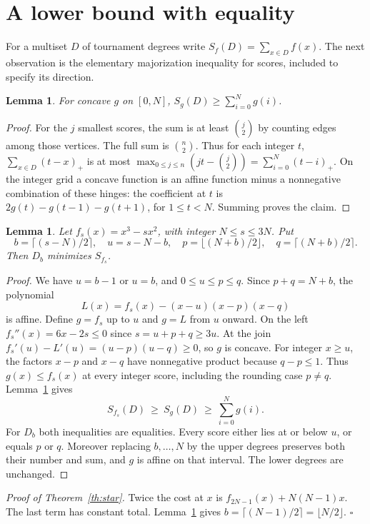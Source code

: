 \documentclass[11pt]{article}
\newtheorem{lemma}[theorem]{Lemma}
\newcommand{\fl}[1]{\lfloor #1\rfloor}
\newcommand{\ce}[1]{\lceil #1\rceil}
\begin{document}
\newpage
\section*{A lower bound with equality}
For a multiset \(D\) of tournament degrees write
\(S_f(D)=\sum_{x\in D} f(x)\). The next observation is the elementary
majorization inequality for scores, included to specify its direction.
\begin{lemma}\label{lem:major}
For concave \(g\) on \([0,N]\),
\(S_g(D)\ge\sum_{i=0}^{N} g(i)\).
\end{lemma}
\begin{proof}
For the \(j\) smallest scores, the sum is at least \(\binom j2\) by
counting edges among those vertices. The full sum is \(\binom n2\).
Thus for each integer \(t\), \(\sum_{x\in D}(t-x)_+\) is at most
\(\max_{0\le j\le n}(jt-\binom j2)=\sum_{i=0}^{N}(t-i)_+\).
On the integer grid a concave function is an affine function minus a
nonnegative combination of these hinges: the coefficient at \(t\) is
\(2g(t)-g(t-1)-g(t+1)\), for \(1\le t<N\). Summing proves the claim.
\end{proof}

\begin{lemma}\label{lem:cert}
Let \(f_s(x)=x^3-sx^2\), with integer \(N\le s\le3N\). Put
\[
 b=\ce{(s-N)/2},\quad u=s-N-b,\quad
 p=\fl{(N+b)/2},\quad q=\ce{(N+b)/2}.
\]
Then \(D_b\) minimizes \(S_{f_s}\).
\end{lemma}
\begin{proof}
We have \(u=b-1\) or \(u=b\), and \(0\le u\le p\le q\).
Since \(p+q=N+b\), the polynomial
\[
   L(x)=f_s(x)-(x-u)(x-p)(x-q)
\]
is affine. Define \(g=f_s\) up to \(u\) and \(g=L\) from \(u\) onward.
On the left \(f_s''(x)=6x-2s\le0\) since \(s=u+p+q\ge3u\).
At the join \(f_s'(u)-L'(u)=(u-p)(u-q)\ge0\), so \(g\) is concave.
For integer \(x\ge u\), the factors \(x-p\) and \(x-q\) have
nonnegative product because \(q-p\le1\). Thus \(g(x)\le f_s(x)\)
at every integer score, including the rounding case \(p\ne q\).
Lemma~\ref{lem:major} gives
\[
 S_{f_s}(D)\ \ge\ S_g(D)\ \ge\ \sum_{i=0}^N g(i).
\]
For \(D_b\) both inequalities are equalities. Every score either lies
at or below \(u\), or equals \(p\) or \(q\). Moreover replacing
\(b,\ldots,N\) by the upper degrees preserves both their number and sum,
and \(g\) is affine on that interval. The lower degrees are unchanged.
\end{proof}

\noindent\emph{Proof of Theorem~\ref{th:star}.}
Twice the cost at \(x\) is \(f_{2N-1}(x)+N(N-1)x\). The last term has
constant total. Lemma~\ref{lem:cert} gives
\(b=\ce{(N-1)/2}=\fl{N/2}\).
\hfill\(\square\)
\end{document}
